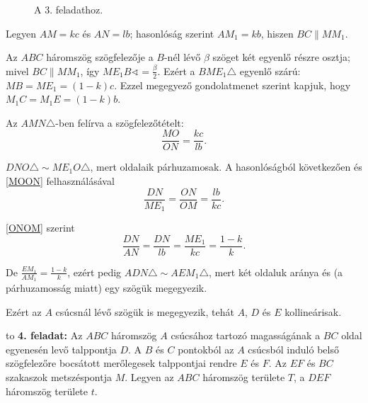 \documentclass[a4paper,10pt]{article}
\newcommand{\vonal}{\hbox to \hsize{\hskip2truecm\hrulefill\hskip2truecm}}
\begin{document}
\begin{figure}
\begin{center}
\end{center}
\caption*{A 3. feladathoz.}
\end{figure}

Legyen $AM=kc$ és $AN=lb$; hasonlóság szerint $AM_1=kb$, hiszen $BC\parallel MM_1$.

Az $ABC$ háromszög szögfelezője a $B$-nél lévő $\beta$ szöget két egyenlő részre osztja; mivel $BC\parallel MM_1$, így $ME_1B\sphericalangle=\frac{\beta}{2}$. Ezért a $BME_1\triangle$ egyenlő szárú: $MB=ME_1=(1-k)c$. Ezzel megegyező gondolatmenet szerint kapjuk, hogy $M_1C=M_1E=(1-k)b$.

Az $AMN\triangle$-ben felírva a szögfelezőtételt:
\begin{equation}\label{MOON}
\frac{MO}{ON}=\frac{kc}{lb}.
\end{equation}

$DNO\triangle\sim ME_1O\triangle$, mert oldalaik párhuzamosak. A hasonlóságból következően és \eqref{MOON} felhasználásával
\begin{equation}\label{ONOM}
\frac{DN}{ME_1}=\frac{ON}{OM}=\frac{lb}{kc}.
\end{equation}

\eqref{ONOM} szerint
\[\frac{DN}{AN}=\frac{DN}{lb}=\frac{ME_1}{kc}=\frac{1-k}{k}.\]

De $\frac{EM_1}{AM_1}=\frac{1-k}{k}$, ezért pedig $ADN\triangle\sim AEM_1\triangle$, mert két oldaluk aránya és (a párhuzamosság miatt) egy szögük megegyezik.

Ezért az $A$ csúcsnál lévő szögük is megegyezik, tehát $A$, $D$ és $E$ kollineárisak.

\medskip

\vonal
{\bf 4. feladat: } 
Az $ABC$ háromszög $A$ csúcsához tartozó magasságának a $BC$ oldal egyenesén levő talppontja $D$. A $B$ és $C$ pontokból az $A$ csúcsból induló belső szögfelezőre bocsátott merőlegesek talppontjai rendre $E$ és $F$. Az $EF$ és $BC$ szakaszok metszéspontja $M$. Legyen az $ABC$ háromszög területe $T$, a $DEF$ háromszög területe $t$.
\end{document}
